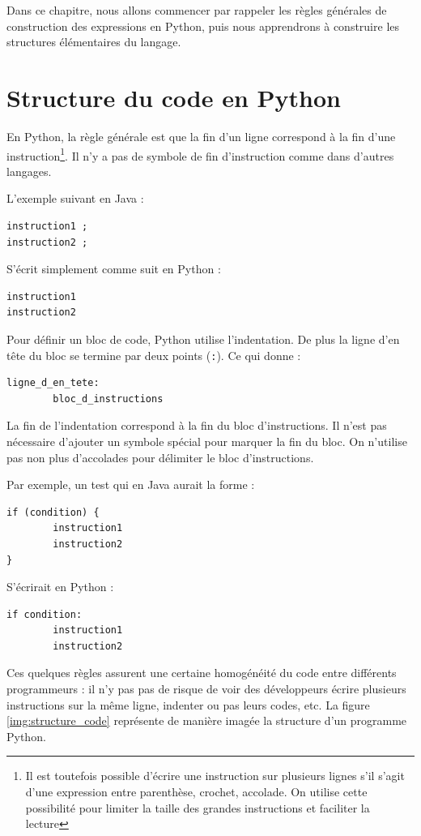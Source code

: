 \documentclass[12pt, a4paper]{article}
\begin{document}
Dans ce chapitre, nous allons commencer par rappeler les règles générales de construction des expressions en Python, puis nous apprendrons à construire les structures élémentaires du langage.


\section{Structure du code en Python}
En Python, la règle générale est que la fin d'un ligne correspond à la fin d'une instruction\footnote{Il est toutefois possible d'écrire une instruction sur plusieurs lignes s'il s'agit d'une expression entre parenthèse, crochet, accolade. On utilise cette possibilité pour limiter la taille des grandes instructions et faciliter la lecture}. Il n'y a pas de symbole de fin d'instruction comme dans d'autres langages.

L'exemple suivant en Java :
\begin{lstlisting}
instruction1 ;
instruction2 ;
\end{lstlisting}

S'écrit simplement comme suit en Python :
\begin{lstlisting}
instruction1
instruction2
\end{lstlisting}

Pour définir un bloc de code, Python utilise l'indentation. De plus la ligne d'en tête du bloc se termine par deux points (\lstinline{:}). Ce qui donne :
\begin{lstlisting}
ligne_d_en_tete:
		bloc_d_instructions
\end{lstlisting}

La fin de l'indentation correspond à la fin du bloc d'instructions. Il n'est pas nécessaire d'ajouter un symbole spécial pour marquer la fin du bloc. On n'utilise pas non plus d'accolades pour délimiter le bloc d'instructions.

Par exemple, un test qui en Java aurait la forme :
\begin{lstlisting}
if (condition) {
		instruction1
		instruction2
}
\end{lstlisting}

S'écrirait en Python :
\begin{lstlisting}
if condition:
		instruction1
		instruction2

\end{lstlisting}

Ces quelques règles assurent une certaine homogénéité du code entre différents programmeurs : il n'y pas pas de risque de voir des développeurs écrire plusieurs instructions sur la même ligne, indenter ou pas leurs codes, etc. La figure \ref{img:structure_code} représente de manière imagée la structure d'un programme Python.
\end{document}
